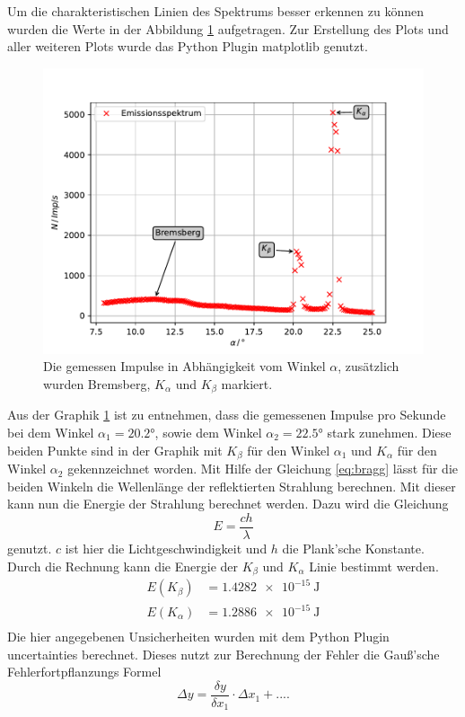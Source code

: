 \FloatBarrier

Um die charakteristischen Linien des Spektrums besser erkennen zu können wurden die Werte in der Abbildung \ref{fig:emission} aufgetragen.
Zur Erstellung des Plots und aller weiteren Plots wurde das Python Plugin matplotlib \cite{matplotlib} genutzt.
\begin{figure}
  \centering
  \includegraphics[width=\textwidth]{content/data/Emission.pdf}
  \caption{Die gemessen Impulse in Abhängigkeit vom Winkel $\alpha$, zusätzlich wurden Bremsberg, $K_\alpha$ und $K_\beta$ markiert.}
  \label{fig:emission}
\end{figure}

Aus der Graphik \ref{fig:emission} ist zu entnehmen, dass die gemessenen Impulse pro Sekunde bei dem Winkel $\alpha_1 = 20.2 \si{\degree}$, sowie dem Winkel $\alpha_2 = 22.5 \si{\degree}$ stark zunehmen.
Diese beiden Punkte sind in der Graphik mit $K_\beta$ für den Winkel $\alpha_1$ und $K_\alpha$ für den Winkel $\alpha_2$ gekennzeichnet worden.
Mit Hilfe der Gleichung \eqref{eq:bragg} lässt für die beiden Winkeln die Wellenlänge der reflektierten Strahlung berechnen.
Mit dieser kann nun die Energie der Strahlung berechnet werden.
Dazu wird die Gleichung
\begin{equation}
  E = \frac{ch}{\lambda}
  \label{eq:energie}
\end{equation}
genutzt.
$c$ ist hier die Lichtgeschwindigkeit und $h$ die Plank'sche Konstante.
Durch die Rechnung kann die Energie der $K_\beta$ und $K_\alpha$ Linie bestimmt werden.
\begin{align*}
  E(K_\beta) & = \SI{1.4282e-15}{\joule}\\
  E(K_\alpha) &= \SI{1.2886e-15}{\joule}\\
\end{align*}
Die hier angegebenen Unsicherheiten wurden mit dem Python Plugin uncertainties \cite{uncertainties} berechnet.
Dieses nutzt zur Berechnung der Fehler die Gauß'sche Fehlerfortpflanzungs Formel
\begin{equation*}
  \Delta y = \frac{\delta y}{\delta x_1} \cdot \Delta x_1 + ....
\end{equation*}

